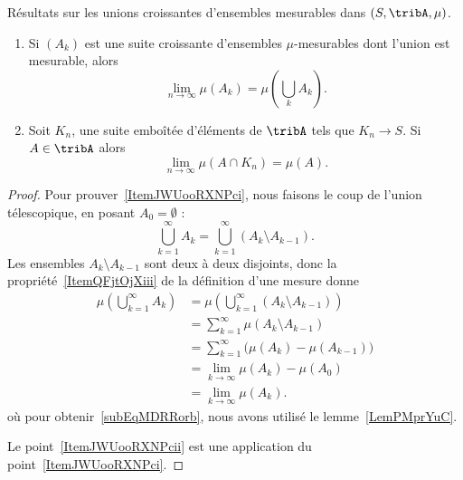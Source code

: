 \begin{lemma}\label{LemAZGByEs}
    Résultats sur les unions croissantes d'ensembles mesurables dans \( (S,\tribA,\mu)\).
    \begin{enumerate}
        \item\label{ItemJWUooRXNPci}
        Si \( (A_k)\) est une suite croissante d'ensembles \( \mu\)-mesurables dont l'union est mesurable, alors
        \begin{equation}
            \lim_{n\to \infty} \mu(A_k)=\mu(\bigcup_kA_k).
        \end{equation}

    \item\label{ItemJWUooRXNPcii}
        Soit \( K_n\), une suite emboîtée d'éléments de \( \tribA\) tels que \( K_n\to S\). Si \( A\in\tribA\) alors
        \begin{equation}
            \lim_{n\to \infty} \mu(A\cap K_n)=\mu(A).
        \end{equation}

    \end{enumerate}
\end{lemma}

\begin{proof}
    Pour prouver~\ref{ItemJWUooRXNPci}, nous faisons le coup de l'union télescopique, en posant \( A_0=\emptyset\) :
    \begin{equation}
        \bigcup_{k=1}^{\infty}A_k=\bigcup_{k=1}^{\infty}(A_k\setminus A_{k-1}).
    \end{equation}
    Les ensembles \( A_k\setminus A_{k-1}\) sont deux à deux disjoints, donc la propriété~\ref{ItemQFjtOjXiii} de la définition d'une mesure donne
    \begin{subequations}
        \begin{align}
            \mu(\bigcup_{k=1}^{\infty}A_k)&=\mu\left( \bigcup_{k=1}^{\infty}(A_k\setminus A_{k-1}) \right)\\
            &=\sum_{k=1}^{\infty}\mu(A_k\setminus A_{k-1})\\
            &=   \sum_{k=1}^{\infty}\big( \mu(A_k)-\mu(A_{k-1}) \big)    \label{subEqMDRRorb}\\
            &=\lim_{k\to \infty} \mu(A_k)-\mu(A_0)\\
            &=\lim_{k\to \infty} \mu(A_k).
        \end{align}
    \end{subequations}
    où pour obtenir~\ref{subEqMDRRorb}, nous avons utilisé le lemme~\ref{LemPMprYuC}.

    Le point~\ref{ItemJWUooRXNPcii} est une application du point~\ref{ItemJWUooRXNPci}.
\end{proof}

